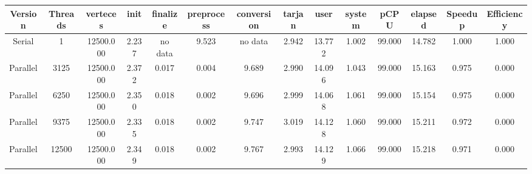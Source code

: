 \begin{tabular}{|c|c|c|c|c|c|c|c|c|c|c|c|c|c|}
\toprule
 Version &  Threads &  verteces &  init & finalize &  preprocess & conversion &  tarjan &   user &  system &   pCPU &  elapsed &  Speedup &  Efficiency \\
\midrule
  Serial &        1 & 12500.000 & 2.237 &  no data &       9.523 &    no data &   2.942 & 13.772 &   1.002 & 99.000 &   14.782 &    1.000 &       1.000 \\
Parallel &     3125 & 12500.000 & 2.372 &    0.017 &       0.004 &      9.689 &   2.990 & 14.096 &   1.043 & 99.000 &   15.163 &    0.975 &       0.000 \\
Parallel &     6250 & 12500.000 & 2.350 &    0.018 &       0.002 &      9.696 &   2.999 & 14.068 &   1.061 & 99.000 &   15.154 &    0.975 &       0.000 \\
Parallel &     9375 & 12500.000 & 2.335 &    0.018 &       0.002 &      9.747 &   3.019 & 14.128 &   1.060 & 99.000 &   15.211 &    0.972 &       0.000 \\
Parallel &    12500 & 12500.000 & 2.349 &    0.018 &       0.002 &      9.767 &   2.993 & 14.129 &   1.066 & 99.000 &   15.218 &    0.971 &       0.000 \\
\bottomrule
\end{tabular}
